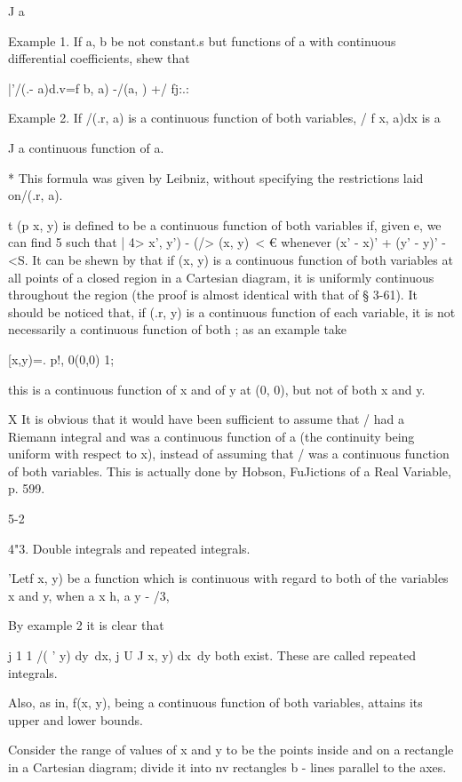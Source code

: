 J a

Example 1. If a, b be not constant.s but functions of a with
continuous differential coefficients, shew that

 |'/(.- a)d.v=f b, a) -/(a, ) +/ fj:.:

Example 2. If /(.r, a) is a continuous function of both variables, / f
x, a)dx is a

J a continuous function of a.

* This formula was given by Leibniz, without specifying the
restrictions laid on/(.r, a).

t (p x, y) is defined to be a continuous function of both variables
if, given e, we can find 5 such that | 4> x', y') - (/> (x, y)\ < €
whenever (x' - x)' + (y' - y)' -<S. It can be shewn by that if
(x, y) is a continuous function of both variables at all points of a
closed region in a Cartesian diagram, it is uniformly continuous
throughout the region (the proof is almost identical with that of §
3-61). It should be noticed that, if (.r, y) is a continuous function
of each variable, it is not necessarily a continuous function of both
; as an example take

 [x,y)=. p!, 0(0,0) 1;

this is a continuous function of x and of y at (0, 0), but not of both
x and y.

X It is obvious that it would have been sufficient to assume that /
had a Riemann integral and was a continuous function of a (the
continuity being uniform with respect to x), instead of assuming that
/ was a continuous function of both variables. This is actually done
by Hobson, FuJictions of a Real Variable, p. 599.

5-2

%
%

4"3. Double integrals and repeated integrals.

'Letf x, y) be a function which is continuous with regard to both of
the variables x and y, when a x h, a y - /3,

By example 2 it is clear that

j 1 1 /( ' y) dy\ dx, j U J x, y) dx\ dy both exist. These are called
repeated integrals.

Also, as in, f(x, y), being a continuous function of both
variables, attains its upper and lower bounds.

Consider the range of values of x and y to be the points inside and on
a rectangle in a Cartesian diagram; divide it into nv rectangles b -
lines parallel to the axes.


